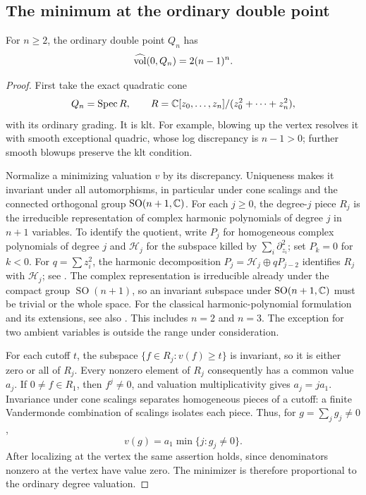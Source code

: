 \subsection{The minimum at the ordinary double point}

\begin{lemma}\label{end:odp-value}
For \(n\ge2\), the ordinary double point \(Q_n\) has
\[
                           \widehat{\operatorname{vol}}(0,Q_n)=2(n-1)^n.
\]
\end{lemma}

\begin{proof}
First take the exact quadratic cone
\[
 Q_n=\operatorname{Spec} R,\qquad
 R=\mathbb C[z_0,\ldots,z_n]/(z_0^2+\cdots+z_n^2),
\]
with its ordinary grading. It is klt. For example, blowing
up the vertex resolves it with smooth exceptional quadric,
whose log discrepancy is \(n-1>0\); further smooth
blowups preserve the klt condition.

Normalize a minimizing valuation \(v\) by its discrepancy.
Uniqueness makes it invariant under all automorphisms,
in particular under cone scalings and the connected
orthogonal group \(\operatorname{SO}(n+1,\mathbb C)\).
For each \(j\ge0\), the degree-\(j\) piece \(R_j\) is
the irreducible representation of complex harmonic polynomials
of degree \(j\) in \(n+1\) variables. To identify the quotient,
write \(P_j\) for homogeneous complex polynomials of degree \(j\)
and \(\mathcal H_j\) for the subspace killed by
\(\sum_i\partial_{z_i}^2\); set \(P_k=0\) for \(k<0\).
For \(q=\sum z_i^2\), the harmonic decomposition
\(P_j=\mathcal H_j\oplus qP_{j-2}\) identifies \(R_j\) with
\(\mathcal H_j\); see
\cite[Example~251 and Theorem~257]{GrahamSwansonMatthews15}.
The complex representation is irreducible already under the compact
group \(\operatorname{SO}(n+1)\), so an invariant subspace under
\(\operatorname{SO}(n+1,\mathbb C)\) must be trivial or the whole space.
For the classical harmonic-polynomial formulation and its extensions,
see also \cite[Section~1]{LuoXu12}.
This includes \(n=2\) and \(n=3\).
The exception for two ambient variables is outside
the range under consideration.

For each cutoff \(t\), the subspace
\(\{f\in R_j:v(f)\ge t\}\) is invariant, so it is
either zero or all of \(R_j\). Every nonzero element of
\(R_j\) consequently has a common value \(a_j\).
If \(0\ne f\in R_1\), then \(f^j\ne0\), and
valuation multiplicativity gives \(a_j=j a_1\).
Invariance under cone scalings separates homogeneous
pieces of a cutoff: a finite Vandermonde combination
of scalings isolates each piece. Thus, for
\(g=\sum_j g_j\ne0\),
\[
                       v(g)=a_1\min\{j:g_j\ne0\}.
\]
After localizing at the vertex the same assertion
holds, since denominators nonzero at the vertex have
value zero. The minimizer is therefore proportional
to the ordinary degree valuation.


\end{proof}

